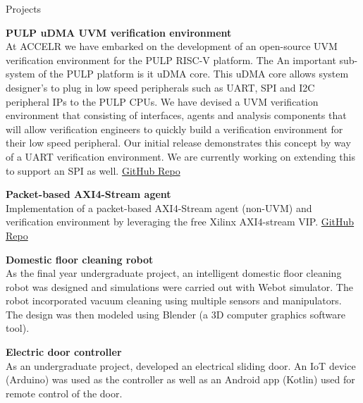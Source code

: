 \documentclass[
	11pt, %
]{./assets/resume} %
\begin{document}

\begin{rSection}{Projects}

	\textbf{PULP uDMA UVM verification environment} \\
	At ACCELR we have embarked on the development of an open-source UVM verification environment for the PULP RISC-V platform. The An important sub-system of the PULP platform is it uDMA core. This uDMA core allows system designer's to plug in low speed peripherals such as UART, SPI and I2C peripheral IPs to the PULP CPUs. We have devised a UVM verification environment that consisting of interfaces, agents and analysis components that will allow verification engineers to quickly build a verification environment for their low speed peripheral. Our initial release demonstrates this concept by way of a UART verification environment. We are currently working on extending this to support an SPI as well. \href{https://github.com/accelr-net/udma_uart_vip}{GitHub Repo}

	\textbf{Packet-based AXI4-Stream agent} \\
	Implementation of a packet-based AXI4-Stream agent (non-UVM) and verification environment by leveraging the free Xilinx AXI4-stream VIP. \href{https://github.com/accelr-net/axis_fifo_unit_test}{GitHub Repo}

	\textbf{Domestic floor cleaning robot} \\
	As the final year undergraduate project, an intelligent domestic floor cleaning robot was designed and simulations were carried out with Webot simulator. The robot incorporated vacuum cleaning using multiple sensors and manipulators. The design was then modeled using Blender (a 3D computer graphics software tool).

	\textbf{Electric door controller} \\
	As an undergraduate project, developed an electrical sliding door. An IoT device (Arduino) was used as the controller as well as an Android app (Kotlin) used for remote control of the door.

\end{rSection}

\end{document}
